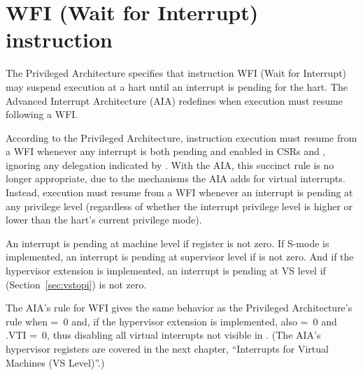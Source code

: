 \section{WFI (Wait for Interrupt) instruction}

The {\RISCV} Privileged Architecture specifies that
instruction WFI (Wait for Interrupt) may suspend execution
at a hart until an interrupt is pending for the hart.
The Advanced Interrupt Architecture (AIA) redefines
when execution must resume following a WFI.

According to the {\RISCV} Privileged Architecture, instruction
execution must resume from a WFI whenever any interrupt
is both pending and enabled in CSRs  and ,
ignoring any delegation indicated by .
With the AIA, this succinct rule is no longer appropriate,
due to the mechanisms the AIA adds for virtual interrupts.
Instead, execution must resume from a WFI whenever
an interrupt is pending at any privilege level
(regardless of whether the interrupt privilege level is
higher or lower than the hart's current privilege mode).

An interrupt is pending at machine level
if register  is not zero.
If \mbox{S-mode} is implemented, an interrupt is
pending at supervisor level if  is not zero.
And if the hypervisor extension is implemented, an interrupt is pending
at VS level if  (Section~\ref{sec:vstopi}) is not zero.

\begin{commentary}
The AIA's rule for WFI gives the same behavior as the Privileged
Architecture's rule when\/  =~0 and, if the hypervisor
extension is implemented, also  =~0 and\/ .VTI =~0,
thus disabling all virtual interrupts not visible in\/ .
(The AIA's hypervisor registers are covered in the next chapter,
``Interrupts for Virtual Machines (VS Level)''.)
\end{commentary}

